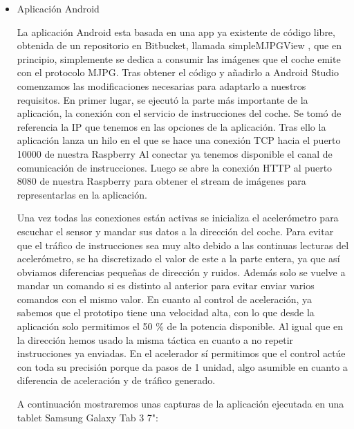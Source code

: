 \documentclass{pclass}
\begin{document}
\begin{itemize}
\begin{itemize}
	
		\cite{OpenCV}

	\medskip

	\item Aplicación Android
	
	La aplicación Android esta basada en una app ya existente de código libre, obtenida de un repositorio en Bitbucket, llamada simpleMJPGView \cite{simpleMJPG}, que en principio, simplemente se dedica a consumir las imágenes que el coche emite con el protocolo MJPG. Tras obtener el código y añadirlo a Android Studio comenzamos las modificaciones necesarias para adaptarlo a nuestros requisitos. En primer lugar, se ejecutó la parte más importante de la aplicación, la conexión con el servicio de instrucciones del coche. Se tomó de referencia la IP que tenemos en las opciones de la aplicación. Tras ello la aplicación lanza un hilo en el que se hace una conexión TCP hacia el puerto 10000 de nuestra Raspberry Al conectar ya tenemos disponible el canal de comunicación de instrucciones. Luego se abre la conexión HTTP al puerto 8080 de nuestra Raspberry para obtener el stream de imágenes para representarlas en la aplicación. 
	
	Una vez todas las conexiones están activas se inicializa el acelerómetro para escuchar el sensor y mandar sus datos a la dirección del coche. Para evitar que el tráfico de instrucciones sea muy alto debido a las continuas lecturas del acelerómetro, se ha discretizado el valor de este a la parte entera, ya que así obviamos diferencias pequeñas de dirección y ruidos. Además solo se vuelve a mandar un comando si es distinto al anterior para evitar enviar varios comandos con el mismo valor. En cuanto al control de aceleración, ya sabemos que el prototipo tiene una velocidad alta, con lo que desde la aplicación solo permitimos el 50 \%  de la potencia disponible. Al igual que en la dirección hemos usado la misma táctica en cuanto a no repetir instrucciones ya enviadas. En el acelerador sí permitimos que el control actúe con toda su precisión porque da pasos de 1 unidad, algo asumible en cuanto a diferencia de aceleración y de tráfico generado.
	
	A continuación mostraremos unas capturas de la aplicación ejecutada en una tablet Samsung Galaxy Tab 3 7":
	

\end{itemize}
\end{itemize}
\end{document}
